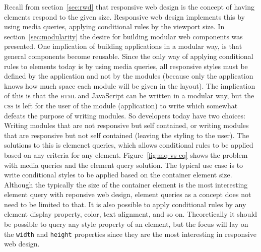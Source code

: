 \documentclass[a4paper,11pt]{kth-mag}
\newcommand{\code}[1]{\texttt{#1}}
\begin{document}
      Recall from section~\ref{sec:rwd} that responsive web design is the concept of having elements respond to the given size.
      Responsive web design implements this by using media queries, applying conditional rules by the viewport size.
      In section~\ref{sec:modularity} the desire for building modular web components was presented.
      One implication of building applications in a modular way, is that general components become reusable.
      Since the only way of applying conditional rules to elements today is by using media queries, all responsive styles must be defined by the application and not by the modules (because only the application knows how much space each module will be given in the layout).
      The implication of this is that the \textsc{html} and JavaScript can be written in a modular way, but the \textsc{css} is left for the user of the module (application) to write which somewhat defeats the purpose of writing modules.
      So developers today have two choices: Writing modules that are not responsive but self contained, or writing modules that are responsive but not self contained (leaving the styling to the user).
      The solutions to this is elemenet queries, which allows conditional rules to be applied based on any criteria for any element.
      Figure~\ref{fig:mq-vs-eq} shows the problem with media queries and the element query solution.
      The typical use case is to write conditional styles to be applied based on the container element size.
      Although the typically the size of the container element is the most interesting element query with reponsive web design, element queries as a concept does not need to be limited to that.
      It is also possible to apply conditional rules by any element display property, color, text alignment, and so on.
      Theoretically it should be possible to query any style property of an element, but the focus will lay on the \code{width} and \code{height} properties since they are the most interesting in responsive web design.
\end{document}
